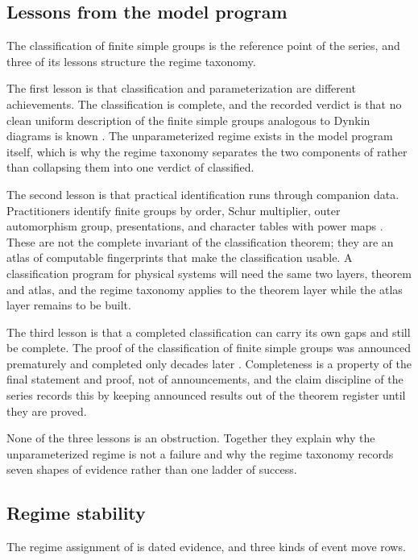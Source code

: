\documentclass[11pt,letterpaper]{article}
\theoremstyle{definition}
\theoremstyle{remark}
\begin{document}
\subsection{Lessons from the model program}

The classification of finite simple groups is the reference point of the series, and three of its lessons structure the regime taxonomy.

The first lesson is that classification and parameterization are different achievements. The classification is complete, and the recorded verdict is that no clean uniform description of the finite simple groups analogous to Dynkin diagrams is known \cite{solomon2001}. The unparameterized regime exists in the model program itself, which is why the regime taxonomy separates the two components of  rather than collapsing them into one verdict of classified.

The second lesson is that practical identification runs through companion data. Practitioners identify finite groups by order, Schur multiplier, outer automorphism group, presentations, and character tables with power maps \cite{atlaswiki}. These are not the complete invariant of the classification theorem; they are an atlas of computable fingerprints that make the classification usable. A classification program for physical systems will need the same two layers, theorem and atlas, and the regime taxonomy applies to the theorem layer while the atlas layer remains to be built.

The third lesson is that a completed classification can carry its own gaps and still be complete. The proof of the classification of finite simple groups was announced prematurely and completed only decades later \cite{solomon2001}. Completeness is a property of the final statement and proof, not of announcements, and the claim discipline of the series records this by keeping announced results out of the theorem register until they are proved.

None of the three lessons is an obstruction. Together they explain why the unparameterized regime is not a failure and why the regime taxonomy records seven shapes of evidence rather than one ladder of success.

\subsection{Regime stability}

The regime assignment of  is dated evidence, and three kinds of event move rows.
\end{document}
